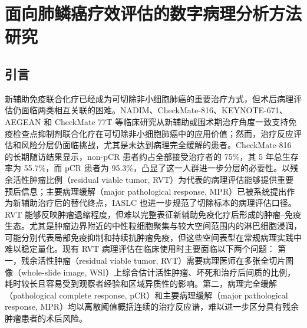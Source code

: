 \chapter{面向肺鳞癌疗效评估的数字病理分析方法研究}

\section{引言}
新辅助免疫联合化疗已经成为可切除非小细胞肺癌的重要治疗方式，但术后病理评估仍面临两类相互关联的困难。NADIM、CheckMate-816、KEYNOTE-671、AEGEAN 和 CheckMate 77T 等临床研究从新辅助或围术期治疗角度一致支持免疫检查点抑制剂联合化疗在可切除非小细胞肺癌中的应用价值\cite{provencio2020nadim,forde2022checkmate816,wakelee2023keynote671,heymach2023aegean,cascone2024checkmate77t}；然而，治疗反应评估和风险分层仍面临挑战，尤其是未达到病理完全缓解的患者。CheckMate-816 的长期随访结果显示，non-pCR 患者约占全部接受治疗者的 75\%，其 5 年总生存率为 55.7\%，而 pCR 患者为 95.3\%，凸显了这一人群进一步分层的必要性。以残余活性肿瘤比例（residual viable tumor, RVT）为代表的病理评估能够提供重要预后信息；主要病理缓解（major pathological response, MPR）已被系统提出作为新辅助治疗后的替代终点，IASLC 也进一步规范了切除标本的病理评估口径\cite{hellmann2014mpr,travis2020iaslc}。
RVT 能够反映肿瘤退缩程度，但难以完整表征新辅助免疫化疗后形成的肿瘤--免疫生态。尤其是肿瘤边界附近的中性粒细胞聚集与较大空间范围内的淋巴细胞浸润，可能分别代表局部免疫抑制和持续抗肿瘤免疫，但这些空间表型在常规病理实践中难以稳定量化。现有 RVT 病理评估在临床使用时主要面临以下两个问题：
第一，残余活性肿瘤（residual viable tumor, RVT）需要病理医师在多张全切片图像（whole-slide image, WSI）上综合估计活性肿瘤、坏死和治疗后间质的比例，耗时较长且容易受到观察者经验和区域异质性的影响。第二，病理完全缓解（pathological complete response, pCR）和主要病理缓解（major pathological response, MPR）均以离散阈值概括连续的治疗反应谱，难以进一步区分具有残余肿瘤患者的术后风险。

